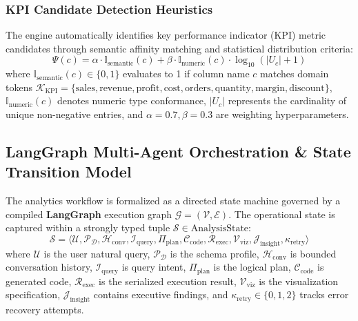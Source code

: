 \documentclass[conference]{IEEEtran}
\begin{document}
\subsubsection{KPI Candidate Detection Heuristics}
The engine automatically identifies key performance indicator (KPI) metric candidates through semantic affinity matching and statistical distribution criteria:
\begin{equation}
\Psi(c) = \alpha \cdot \mathbb{I}_{\text{semantic}}(c) + \beta \cdot \mathbb{I}_{\text{numeric}}(c) \cdot \log_{10}(|U_c| + 1)
\end{equation}
where $\mathbb{I}_{\text{semantic}}(c) \in \{0, 1\}$ evaluates to 1 if column name $c$ matches domain tokens $\mathcal{K}_{\text{KPI}} = \{\text{sales}, \text{revenue}, \text{profit}, \text{cost}, \text{orders}, \text{quantity}, \text{margin}, \text{discount}\}$, $\mathbb{I}_{\text{numeric}}(c)$ denotes numeric type conformance, $|U_c|$ represents the cardinality of unique non-negative entries, and $\alpha = 0.7, \beta = 0.3$ are weighting hyperparameters.

\subsection{LangGraph Multi-Agent Orchestration \& State Transition Model}
The analytics workflow is formalized as a directed state machine governed by a compiled \textbf{LangGraph} execution graph $\mathcal{G} = (\mathcal{V}, \mathcal{E})$. The operational state is captured within a strongly typed tuple $\mathcal{S} \in \text{AnalysisState}$:
\begin{equation}
\mathcal{S} = \langle \mathcal{U}, \mathcal{P}_{\mathcal{D}}, \mathcal{H}_{\text{conv}}, \mathcal{I}_{\text{query}}, \Pi_{\text{plan}}, \mathcal{C}_{\text{code}}, \mathcal{R}_{\text{exec}}, \mathcal{V}_{\text{viz}}, \mathcal{J}_{\text{insight}}, \kappa_{\text{retry}} \rangle
\end{equation}
where $\mathcal{U}$ is the user natural query, $\mathcal{P}_{\mathcal{D}}$ is the schema profile, $\mathcal{H}_{\text{conv}}$ is bounded conversation history, $\mathcal{I}_{\text{query}}$ is query intent, $\Pi_{\text{plan}}$ is the logical plan, $\mathcal{C}_{\text{code}}$ is generated code, $\mathcal{R}_{\text{exec}}$ is the serialized execution result, $\mathcal{V}_{\text{viz}}$ is the visualization specification, $\mathcal{J}_{\text{insight}}$ contains executive findings, and $\kappa_{\text{retry}} \in \{0, 1, 2\}$ tracks error recovery attempts.
\end{document}
